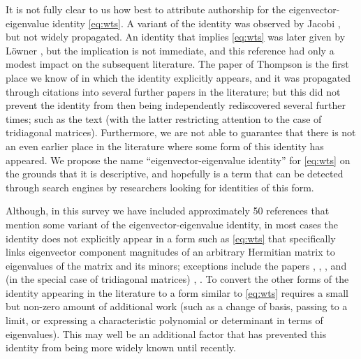 \documentclass{amsart}
\begin{document}
It is not fully clear to us how best to attribute authorship for the eigenvector-eigenvalue identity \eqref{eq:wts}.  A variant of the identity was observed by Jacobi \cite{jacobi}, but not widely propagated.  An identity that implies \eqref{eq:wts} was later given by L\"owner \cite{Lowner}, but the implication is not immediate, and this reference had only a modest impact on the subsequent literature.  The paper of Thompson \cite{Thompson:1966} is the first  place we know of in which the identity explicitly appears, and it was propagated through citations into several further papers in the literature; but this did not prevent the identity from then being independently rediscovered several further times; such as the text \cite{golub} (with the latter restricting attention to the case of tridiagonal matrices).  Furthermore, we are not able to guarantee that there is not an even earlier place in the literature where some form of this identity has appeared.  We propose the name ``eigenvector-eigenvalue identity'' for \eqref{eq:wts} on the grounds that it is descriptive, and hopefully is a term that can be detected through search engines by researchers looking for identities of this form.


Although, in this survey we have included approximately 50 references that mention some variant of the eigenvector-eigenvalue identity, in most cases the identity does not explicitly appear in a form such as  \eqref{eq:wts} that specifically links eigenvector component magnitudes of an arbitrary Hermitian matrix to eigenvalues of the matrix and its minors; exceptions include the papers \cite{Thompson:1966} , \cite{Thompson:1968}, \cite{NTU}, and (in the special case of tridiagonal matrices) \cite{golub}, \cite{xu}.  To convert the other forms of the identity appearing in the literature to a form similar to  \eqref{eq:wts} requires a small but non-zero amount of additional work (such as a change of basis, passing to a limit, or expressing a characteristic polynomial or determinant in terms of eigenvalues).  This may well be an additional factor that has prevented this identity from being more widely known until recently.
\end{document}
